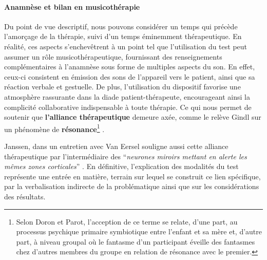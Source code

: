 \paragraph{\textbf{Anamnèse et bilan en musicothérapie}}
Du point de vue descriptif, nous pouvons considérer un temps qui
précède
l'amorçage de la thérapie, suivi d'un temps éminemment thérapeutique.
En réalité, ces aspects s'enchevêtrent à un point tel que
l'utilisation du test peut assumer un rôle musicothérapeutique, fournissant des
  renseignements complémentaires à l'anamnèse sous forme de multiples
  aspects du son. En effet, ceux-ci consistent en émission des sons de
  l'appareil vers le patient, ainsi que sa réaction verbale et gestuelle.
De plus, l'utilisation
   du dispositif favorise une atmosphère rassurante dans la diade
   patient-thérapeute, encourageant ainsi la complicité collaborative
 indispensable à toute
 thérapie.
Ce qui nous permet de soutenir que
 \textbf{l'alliance thérapeutique} demeure axée, comme le relève Gindl
  \autocite{gindl} sur
 un phénomène de \textbf{résonance}\footnote{Selon Doron et Parot, l'acception de ce terme se relate, d'une part, au processus psychique
primaire symbiotique entre l'enfant et sa mère et, d'autre part, à
niveau groupal où le fantasme d'un participant éveille des fantasmes chez d'autres membres du groupe en relation
de résonance  avec le premier.} \autocite{doronparot}.



Janssen, dans un entretien
avec Van Eersel
souligne aussi cette alliance thérapeutique
par l'intermédiaire des ``\textit{neurones
 miroirs mettant en alerte les mêmes zones corticales}'' \autocite[203]{van_eersel_cerveau}.
En définitive, l'explication des modalités du test représente une
  entrée en matière, terrain  sur lequel se construit ce lien spécifique,
  par la verbalisation indirecte de la problématique ainsi que sur
  les considérations des résultats.


